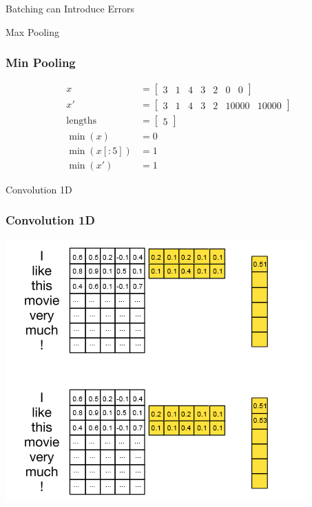 \documentclass{beamer}
\begin{document}
\begin{section}{Batching can Introduce Errors}
\begin{subsection}{Max Pooling}
        \begin{frame}
            \frametitle{Min Pooling}
            \begin{align*}
                x &= \begin{bmatrix}
                    3 & 1 & 4 & 3 & 2 & 0 & 0
                \end{bmatrix}\\
                x' &= \begin{bmatrix}
                    3 & 1 & 4 & 3 & 2 & 10000 & 10000
                \end{bmatrix}\\
                \text{lengths} &= \begin{bmatrix} 5 \end{bmatrix} \\
                \min(x) &= 0 \\
                \min(x[:5]) &= 1\\
                \min(x') &= 1
            \end{align*}
        \end{frame}

    \end{subsection} %

    \begin{subsection}{Convolution 1D}

        \begin{frame}
            \frametitle{Convolution 1D}
            \begin{center}
                \includegraphics[height=0.8\textheight]{images/conv.jpg}
            \end{center}


\end{frame}
\end{subsection}
\end{section}
\end{document}
